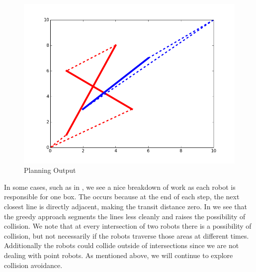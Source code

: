 \begin{figure}[h!]
\centering
\includegraphics[width=0.49\columnwidth]{figs/figure_1.png}
\caption{Planning Output}
\label{fig:planner_good}
\end{figure}

In some cases, such as in , we see a nice breakdown of work as each robot is responsible for one box. The occurs because at the end of each step, the next closest line is directly adjacent, making the transit distance zero. In  we see that the greedy approach segments the lines less cleanly and raises the possibility of collision. We note that at every intersection of two robots there is a possibility of collision, but not necessarily if the robots traverse those areas at different times. Additionally the robots could collide outside of intersections since we are not dealing with point robots. As mentioned above, we will continue to explore collision avoidance. 

